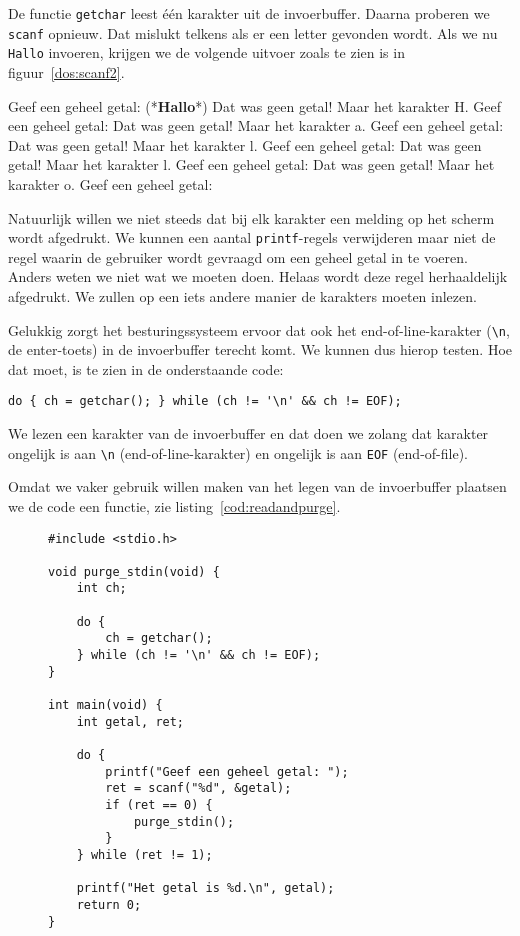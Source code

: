 De functie \texttt{getchar} leest \'e\'en karakter uit de invoerbuffer. Daarna proberen we \texttt{scanf} opnieuw. Dat mislukt telkens als er een letter gevonden wordt. Als we nu \texttt{Hallo} invoeren, krijgen we de volgende uitvoer zoals te zien is in figuur~\ref{dos:scanf2}.

\begin{dosbox}[title=Uitvoer van het programma.,label=dos:scanf2]
Geef een geheel getal: (*\textbf{Hallo}*)
Dat was geen getal!
Maar het karakter H.
Geef een geheel getal: Dat was geen getal!
Maar het karakter a.
Geef een geheel getal: Dat was geen getal!
Maar het karakter l.
Geef een geheel getal: Dat was geen getal!
Maar het karakter l.
Geef een geheel getal: Dat was geen getal!
Maar het karakter o.
Geef een geheel getal:
\end{dosbox}

Natuurlijk willen we niet steeds dat bij elk karakter een melding op het scherm wordt afgedrukt. We kunnen een aantal \texttt{printf}-regels verwijderen maar niet de regel waarin de gebruiker wordt gevraagd om een geheel getal in te voeren. Anders weten we niet wat we moeten doen. Helaas wordt deze regel herhaaldelijk afgedrukt. We zullen op een iets andere manier de karakters moeten inlezen.

Gelukkig zorgt het besturingssysteem ervoor dat ook het end-of-line-karakter (\texttt{\textbackslash n}, de enter-toets) in de invoerbuffer terecht komt. We kunnen dus hierop testen. Hoe dat moet, is te zien in de onderstaande code:

\begin{lstlisting}[style=lstoneline]
do { ch = getchar(); } while (ch != '\n' && ch != EOF);
\end{lstlisting}

We lezen een karakter van de invoerbuffer en dat doen we zolang dat karakter ongelijk is aan \texttt{\textbackslash n} (end-of-line-karakter) en ongelijk is aan \texttt{EOF} (end-of-file).

Omdat we vaker gebruik willen maken van het legen van de invoerbuffer plaatsen we de code een functie, zie listing~\ref{cod:readandpurge}.

\begin{figure}[!ht]
\begin{lstlisting}[caption=Inlezen van een geheel getal.,label=cod:readandpurge]
#include <stdio.h>

void purge_stdin(void) {
    int ch;

    do {
        ch = getchar();
    } while (ch != '\n' && ch != EOF);
}

int main(void) {
    int getal, ret;

    do {
        printf("Geef een geheel getal: ");
        ret = scanf("%d", &getal);
        if (ret == 0) {
            purge_stdin();
        }
    } while (ret != 1);

    printf("Het getal is %d.\n", getal);
    return 0;
}
\end{lstlisting}
\end{figure}


